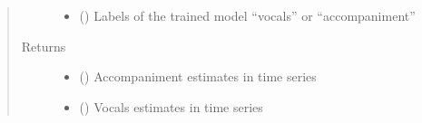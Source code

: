 \documentclass[letterpaper,10pt,english,openany,oneside]{sphinxmanual}
\begin{document}
\begin{fulllineitems}
\begin{quote}
\begin{description}
\begin{itemize}
\item {} 
 () \textendash{} Labels of the trained model “vocals” or “accompaniment”

\end{itemize}

\item[{Returns}] \leavevmode
\begin{itemize}
\item {} 
 () \textendash{} Accompaniment estimates in time series

\item {} 
 () \textendash{} Vocals estimates in time series

\end{itemize}


\end{description}\end{quote}

\end{fulllineitems}

\end{document}
